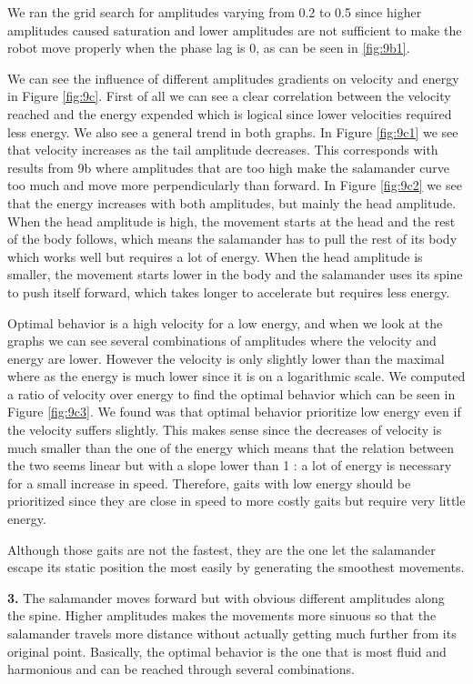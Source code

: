 \documentclass{cmc}
\begin{document}
We ran the grid search for amplitudes varying from 0.2 to 0.5 since higher amplitudes caused saturation and lower amplitudes are not sufficient to make the robot move properly when the phase lag is 0, as can be seen in \ref{fig:9b1}.

We can see the influence of different amplitudes gradients on velocity and energy in Figure \ref{fig:9c}. First of all we can see a clear correlation between the velocity reached and the energy expended which is logical since lower velocities required less energy. We also see a general trend in both graphs. In Figure \ref{fig:9c1} we see that velocity increases as the tail amplitude decreases. This corresponds with results from 9b where amplitudes that are too high make the salamander curve too much and move more perpendicularly than forward. In Figure \ref{fig:9c2} we see that the energy increases with both amplitudes, but mainly the head amplitude. When the head amplitude is high, the movement starts at the head and the rest of the body follows, which means the salamander has to pull the rest of its body which works well but requires a lot of energy. When the head amplitude is smaller, the movement starts lower in the body and the salamander uses its spine to push itself forward, which takes longer to accelerate but requires less energy.

Optimal behavior is a high velocity for a low energy, and when we look at the graphs we can see several combinations of amplitudes where the velocity and energy are lower. However the velocity is only slightly lower than the maximal where as the energy is much lower since it is on a logarithmic scale. We computed a ratio of velocity over energy to find the optimal behavior which can be seen in Figure \ref{fig:9c3}. We found was that optimal behavior prioritize low energy even if the velocity suffers slightly. This makes sense since the decreases of velocity is much smaller than the one of the energy which means that the relation between the two seems linear but with a slope lower than 1 : a lot of energy is necessary for a small increase in speed. Therefore, gaits with low energy should be prioritized since they are close in speed to more costly gaits but require very little energy. 

Although those gaits are not the fastest, they are the one let the salamander escape its static position the most easily by generating the smoothest movements.



\textbf{3.} The salamander moves forward but with obvious different amplitudes along the spine. Higher amplitudes makes the movements more sinuous so that the salamander travels more distance without actually getting much further from its original point. Basically, the optimal behavior is the one that is most fluid and harmonious and can be reached through several combinations.
\end{document}
